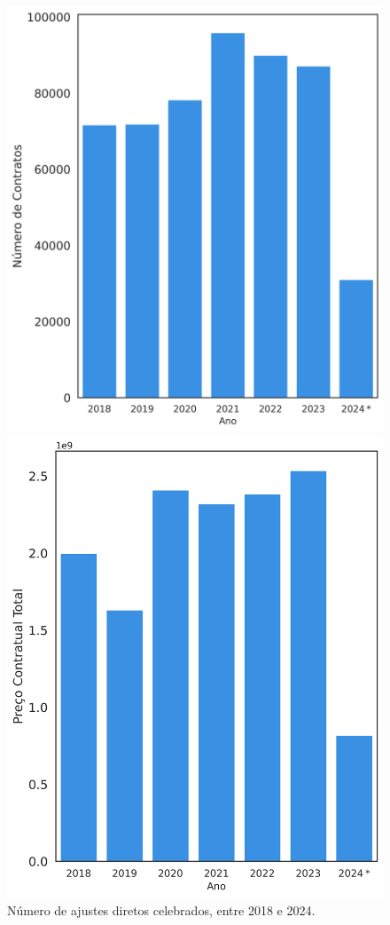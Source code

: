 \begin{figure}[H]
\begin{minipage}{0.31\linewidth}
		\includegraphics[width=\linewidth]{imagens/adir_nrcontr.png}
		\caption{Número de ajustes diretos celebrados, entre 2018 e 2024.}
		\label{fig:precoad1}
	\end{minipage}
	\hfill
	\begin{minipage}{.31\linewidth}
		\includegraphics[width=\linewidth]{imagens/adir_price.png}

\end{minipage}
\end{figure}
